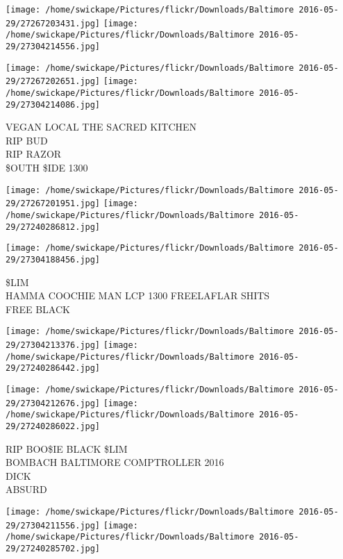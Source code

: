 \documentclass[10pt,letterpaper]{article}
\begin{document}
\texttt{[image: /home/swickape/Pictures/flickr/Downloads/Baltimore 2016-05-29/27267203431.jpg]}
\texttt{[image: /home/swickape/Pictures/flickr/Downloads/Baltimore 2016-05-29/27304214556.jpg]}

\texttt{[image: /home/swickape/Pictures/flickr/Downloads/Baltimore 2016-05-29/27267202651.jpg]}
\texttt{[image: /home/swickape/Pictures/flickr/Downloads/Baltimore 2016-05-29/27304214086.jpg]}

VEGAN LOCAL THE SACRED KITCHEN\\
RIP BUD\\
RIP RAZOR\\
\$OUTH \$IDE 1300\\
\pagebreak

\texttt{[image: /home/swickape/Pictures/flickr/Downloads/Baltimore 2016-05-29/27267201951.jpg]}
\texttt{[image: /home/swickape/Pictures/flickr/Downloads/Baltimore 2016-05-29/27240286812.jpg]}

\vspace{0.25in}
\texttt{[image: /home/swickape/Pictures/flickr/Downloads/Baltimore 2016-05-29/27304188456.jpg]}

\$LIM\\
HAMMA COOCHIE MAN LCP 1300 FREELAFLAR SHITS\\
FREE BLACK\\
\pagebreak

\texttt{[image: /home/swickape/Pictures/flickr/Downloads/Baltimore 2016-05-29/27304213376.jpg]}
\texttt{[image: /home/swickape/Pictures/flickr/Downloads/Baltimore 2016-05-29/27240286442.jpg]}

\texttt{[image: /home/swickape/Pictures/flickr/Downloads/Baltimore 2016-05-29/27304212676.jpg]}
\texttt{[image: /home/swickape/Pictures/flickr/Downloads/Baltimore 2016-05-29/27240286022.jpg]}

RIP BOO\$IE BLACK \$LIM\\
BOMBACH BALTIMORE COMPTROLLER 2016\\
DICK\\
ABSURD\\
\pagebreak

\texttt{[image: /home/swickape/Pictures/flickr/Downloads/Baltimore 2016-05-29/27304211556.jpg]}
\texttt{[image: /home/swickape/Pictures/flickr/Downloads/Baltimore 2016-05-29/27240285702.jpg]}
\end{document}
